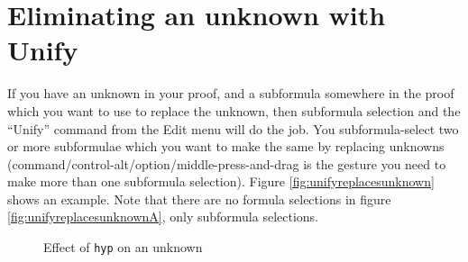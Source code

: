 \documentclass[11pt]{book}
\newcommand{\figref}[1]{figure \ref{fig:#1}}
\newcommand{\Figref}[1]{Figure \ref{fig:#1}}
\begin{document}
\section{Eliminating an unknown with Unify}

If you have an unknown in your proof, and a subformula somewhere in the proof which you want to use to replace the unknown, then subformula selection and the ``Unify'' command from the Edit menu will do the job. You subformula-select two or more subformulae which you want to make the same by replacing unknowns (command/control-alt/option/middle-press-and-drag is the gesture you need to make more than one subformula selection). \Figref{unifyreplacesunknown} shows an example. Note that there are no formula selections in \figref{unifyreplacesunknownA}, only subformula selections.

\begin{figure}
\centering
{}
\qquad
{}
\caption{Effect of \texttt{hyp} on an unknown}
\label{fig:hypreplacesunknown}
\end{figure}
\end{document}
